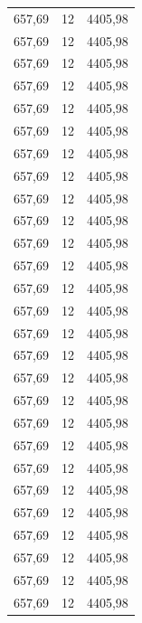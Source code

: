 \begin{center}
\begin{longtable}{|l|l|l|}
657,69            & 12               & 4405,98        \\
657,69            & 12               & 4405,98        \\
657,69            & 12               & 4405,98        \\
657,69            & 12               & 4405,98        \\
657,69            & 12               & 4405,98        \\
657,69            & 12               & 4405,98        \\
657,69            & 12               & 4405,98        \\
657,69            & 12               & 4405,98        \\
657,69            & 12               & 4405,98        \\
657,69            & 12               & 4405,98        \\
657,69            & 12               & 4405,98        \\
657,69            & 12               & 4405,98        \\
657,69            & 12               & 4405,98        \\
657,69            & 12               & 4405,98        \\
657,69            & 12               & 4405,98        \\
657,69            & 12               & 4405,98        \\
657,69            & 12               & 4405,98        \\
657,69            & 12               & 4405,98        \\
657,69            & 12               & 4405,98        \\
657,69            & 12               & 4405,98        \\
657,69            & 12               & 4405,98        \\
657,69            & 12               & 4405,98        \\
657,69            & 12               & 4405,98        \\
657,69            & 12               & 4405,98        \\
657,69            & 12               & 4405,98        \\
657,69            & 12               & 4405,98        \\
657,69            & 12               & 4405,98        \\

\end{longtable}
\end{center}
